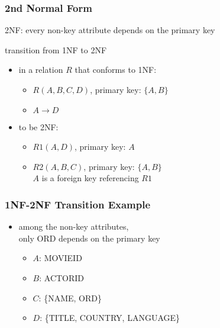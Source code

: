 \documentclass[dvipsnames]{beamer}
\begin{document}
\begin{frame}
  \frametitle{2nd Normal Form}

  \begin{definition}
    \alert{2NF}: every non-key attribute depends on the primary key
  \end{definition}

  \begin{block}{transition from 1NF to 2NF}
    \begin{itemize}
      \item in a relation $R$ that conforms to 1NF:
      \begin{itemize}
        \item $R(A,B,C,D)$, primary key: $\{A,B\}$
        \item $A \rightarrow D$
      \end{itemize}

      \pause
      \item to be 2NF:
      \begin{itemize}
        \item $R1(A,D)$, primary key: $A$
        \item $R2(A,B,C)$, primary key: $\{A,B\}$\\
          $A$ is a foreign key referencing $R1$
      \end{itemize}
    \end{itemize}
  \end{block}
\end{frame}

\begin{frame}
  \frametitle{1NF-2NF Transition Example}

  \begin{example}
    \begin{itemize}
      \item among the non-key attributes,\\
	only ORD depends on the primary key

      \pause
      \begin{itemize}
        \item $A$: MOVIEID
        \item $B$: ACTORID
        \item $C$: \{NAME, ORD\}
        \item $D$: \{TITLE, COUNTRY, LANGUAGE\}
      \end{itemize}
    \end{itemize}
  \end{example}
\end{frame}
\end{document}
